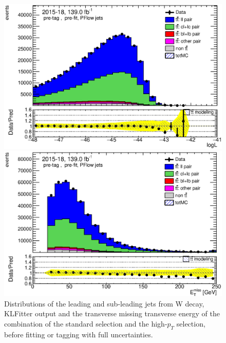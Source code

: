 \documentclass[letterpaper,12pt]{article}
\begin{document}
\begin{figure}
\begin{minipage}[b]{.45\textwidth}
	\end{minipage}\hfill
	\begin{minipage}[b]{.45\textwidth}
	\centering
	\includegraphics[width=1\textwidth]{Oct_distributions/pretagNoRwDL1rwithhighpTPFlow_scaledall/DataMC_LLR.eps}
	\end{minipage}\hfill
	\begin{minipage}[b]{.45\textwidth}
	\centering
	\includegraphics[width=1\textwidth]{Oct_distributions/pretagNoRwDL1rwithhighpTPFlow_scaledall/DataMC_MET.eps}
	\end{minipage}
	\caption{Distributions of the leading and sub-leading jets from W decay, KLFitter output and the 
	transverse missing transverse energy of the combination of the standard selection and the 
	high-$p_T$ selection, before fitting or tagging with full uncertainties.} \label{fig:jets_PFlow}
	\end{figure}
	
\end{document}
